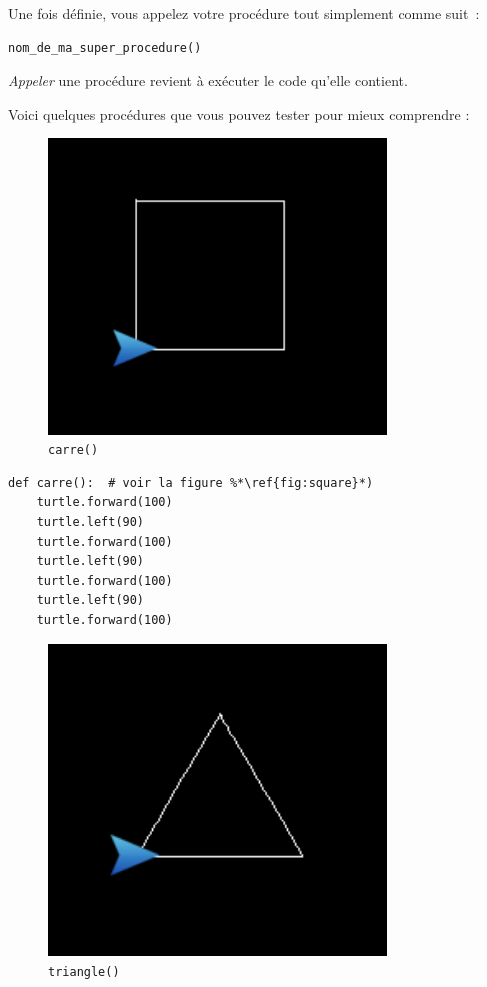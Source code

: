 \documentclass[11pt,a4paper]{article}
\begin{document}
Une fois définie, vous appelez votre procédure tout simplement comme
suit~:

\begin{lstlisting}
nom_de_ma_super_procedure()
\end{lstlisting}

\emph{Appeler} une procédure revient à exécuter le code qu'elle contient.

Voici quelques procédures que vous pouvez tester pour mieux comprendre :

\begin{figure}
    \centering
    \includegraphics[width=0.8\textwidth]{img/square}
    \caption{\lstinline{carre()}}
    \label{fig:square}
\end{figure}

\begin{lstlisting}[float]
def carre():  # voir la figure %*\ref{fig:square}*)
    turtle.forward(100)
    turtle.left(90)
    turtle.forward(100)
    turtle.left(90)
    turtle.forward(100)
    turtle.left(90)
    turtle.forward(100)
\end{lstlisting}
\newpage

\begin{figure}
    \centering
    \includegraphics[width=0.8\textwidth]{img/triangle}
    \caption{\lstinline{triangle()}}
    \label{fig:triangle}
\end{figure}
\end{document}

